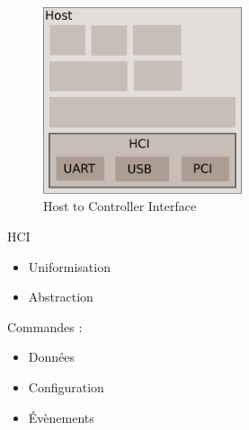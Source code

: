 \begin{frame}
\begin{minipage}[t]{0.60\linewidth}
	\begin{figure}
		\includegraphics[height=5.5cm]{img/arch_log_hci.png}
		\caption{Host to Controller Interface}
	\end{figure}
\end{minipage}
\begin{minipage}[t]{0.30\linewidth}
	\begin{block}{HCI}
		\begin{itemize}
			\item Uniformisation
			\item Abstraction
		\end{itemize}
		Commandes : 
		\begin{itemize}
			\item Données
			\item Configuration
			\item Évènements
		\end{itemize}
	\end{block}
\end{minipage}
\end{frame}

